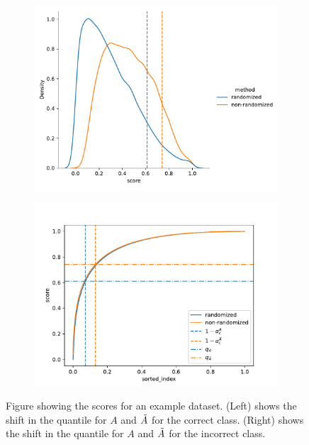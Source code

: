 \begin{figure}
    \begin{subfigure}{0.48\linewidth}
        \centering
        \includegraphics[width=\linewidth]{graphConformal/figures/aps_dist}
    \end{subfigure}
    \begin{subfigure}{0.48\linewidth}
        \centering
        \includegraphics[width=\linewidth]{graphConformal/figures/aps_sorted}
    \end{subfigure}
    \caption{Figure showing the scores for an example dataset. (Left) shows the shift in the quantile for $A$ and $\Tilde{A}$ for the correct class. (Right) shows the shift in the quantile for $A$ and $\Tilde{A}$ for the incorrect class.}
    \label{fig:APS:efficiency}
\end{figure}


